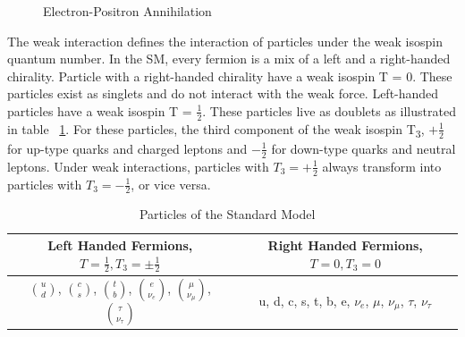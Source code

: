 \begin{figure}[h]
\begin{center}
\caption{Electron-Positron Annihilation}
\label{Fey:e-p}
\end{center}
\end{figure}

\indent The weak interaction defines the interaction of particles under the weak isospin quantum number. In the SM, every fermion is a mix of a left and a right-handed chirality. Particle with a right-handed chirality have a weak isospin T = 0. These particles exist as singlets and do not interact with the weak force. Left-handed particles have a weak isospin T =  ${\frac{1}{2}}$. These particles live as doublets as illustrated in table ~\ref{tab:chiral}. For these particles, the third component of the weak isospin T\textsubscript{3}, ${+\frac{1}{2}}$ for up-type quarks and charged leptons and ${-\frac{1}{2}}$ for down-type quarks and neutral leptons. Under weak interactions, particles with ${T_{3} = +\frac{1}{2}}$ always transform into particles with ${T_{3} = -\frac{1}{2}}$, or vice versa.\newline

\begin{table}[h]
\begin{center}
\def\arraystretch{1.5}
\begin{tabular}[h]{|c|c|}
\hline
Left Handed Fermions, ${T = \frac{1}{2}, T_{3} = \pm\frac{1}{2}}$ & Right Handed Fermions, ${T = 0, T_{3} = 0}$\\
\hline\hline
${\binom{u}{d}}$, ${\binom{c}{s}}$, ${\binom{t}{b}}$, ${\binom{e}{\nu_{e}}}$, ${\binom{\mu}{\nu_{\mu}}}$, ${\binom{\tau}{\nu_{\tau}}}$ & u, d, c, s, t, b, e, ${\nu_{e}}$, ${\mu}$, ${\nu_{\mu}}$, ${\tau}$, ${\nu_{\tau}}$ \\
\hline
\end{tabular}
\caption{Particles of the Standard Model ~\cite{Ian:2018}}
\label{tab:chiral}
\end{center}
\end{table}


